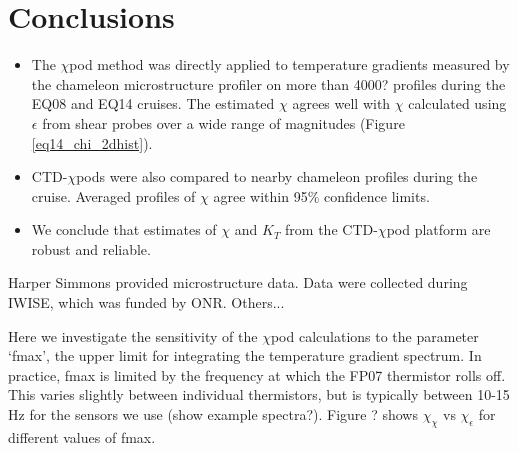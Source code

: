 \documentclass{ametsoc}
\begin{document}
\section{Conclusions}

\begin{itemize}
\item The $\chi$pod method was directly applied to temperature gradients measured by the chameleon microstructure profiler on more than 4000? profiles during the EQ08 and EQ14 cruises. The estimated $\chi$ agrees well with $\chi$ calculated using $\epsilon$ from shear probes over a wide range of magnitudes (Figure \ref{eq14_chi_2dhist}).
\item CTD-$\chi$pods were also compared to nearby chameleon profiles during the cruise. Averaged profiles of $\chi$ agree within 95\% confidence limits.
\item We conclude that estimates of $\chi$ and $K_T$ from the CTD-$\chi$pod platform are robust and reliable.

\end{itemize}






%
\acknowledgments
Harper Simmons provided microstructure data. Data were collected during IWISE, which was funded by ONR. Others...

%

\appendix[A]


Here we investigate the sensitivity of the $\chi$pod calculations to the parameter `fmax', the upper limit for integrating the temperature gradient spectrum. In practice, fmax is limited by the frequency at which the FP07 thermistor rolls off. This varies slightly between individual thermistors, but is typically between 10-15 Hz for the sensors we use (show example spectra?). Figure ? shows $\chi_{\chi}$ vs $\chi_{\epsilon}$ for different values of fmax. 
\end{document}
